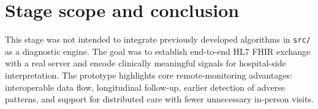 \documentclass[conference]{IEEEtran}
\begin{document}
\section{Stage scope and conclusion}
This stage was not intended to integrate previously developed 
algorithms in \texttt{src/} as a diagnostic engine. 
The goal was to establish end-to-end HL7 FHIR exchange with a real 
server and encode clinically meaningful signals
for hospital-side interpretation. The prototype highlights core 
remote-monitoring advantages: interoperable data flow, 
longitudinal follow-up, earlier detection of adverse patterns, and 
support for distributed care with fewer unnecessary 
in-person visits.

\tiny


\end{document}
